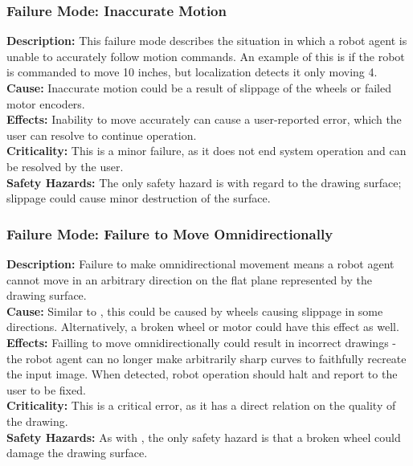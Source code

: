 \subsubsection{Failure Mode: Inaccurate Motion}
\label{sec:locomotion_fm_motion}
\textbf{Description:} This failure mode describes the situation in which a robot agent is unable to accurately follow motion commands. An example of this is if the robot is commanded to move 10 inches, but localization detects it only moving 4.\\
\textbf{Cause:} Inaccurate motion could be a result of slippage of the wheels or failed motor encoders.\\
\textbf{Effects:} Inability to move accurately can cause a user-reported error, which the user can resolve to continue operation. \\
\textbf{Criticality:}  This is a minor failure, as it does not end system operation and can be resolved by the user.\\
\textbf{Safety Hazards:} The only safety hazard is with regard to the drawing surface; slippage could cause minor destruction of the surface.\\

\subsubsection{Failure Mode: Failure to Move Omnidirectionally}
\label{sec:locomotion_fm_omni}
\textbf{Description:} Failure to make omnidirectional movement means a robot agent cannot move in an arbitrary direction on the flat plane represented by the drawing surface.\\
\textbf{Cause:} Similar to , this could be caused by wheels causing slippage in some directions. Alternatively, a broken wheel or motor could have this effect as well.\\
\textbf{Effects:} Failling to move omnidirectionally could result in incorrect drawings - the robot agent can no longer make arbitrarily sharp curves to faithfully recreate the input image. When detected, robot operation should halt and report to the user to be fixed.\\
\textbf{Criticality:}  This is a critical error, as it has a direct relation on the quality of the drawing.\\
\textbf{Safety Hazards:} As with , the only safety hazard is that a broken wheel could damage the drawing surface.\\
